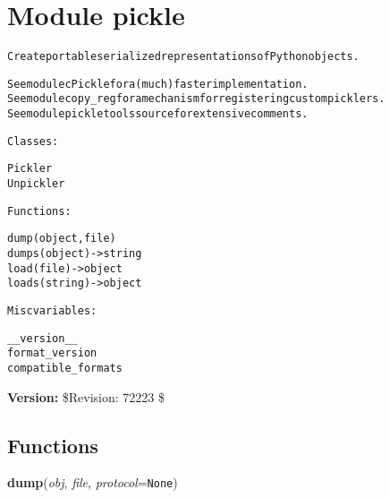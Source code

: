 %
%
%


\section{Module pickle}

    \label{pickle}
\begin{alltt}
Create portable serialized representations of Python objects.

See module cPickle for a (much) faster implementation.
See module copy\_reg for a mechanism for registering custom picklers.
See module pickletools source for extensive comments.

Classes:

    Pickler
    Unpickler

Functions:

    dump(object, file)
    dumps(object) -{\textgreater} string
    load(file) -{\textgreater} object
    loads(string) -{\textgreater} object

Misc variables:

    \_\_version\_\_
    format\_version
    compatible\_formats
\end{alltt}

\textbf{Version:} \$Revision: 72223 \$





  \subsection{Functions}

    \label{pickle:dump}

    \vspace{0.5ex}

\hspace{.8\funcindent}\begin{boxedminipage}{\funcwidth}

    \raggedright \textbf{dump}(\textit{obj}, \textit{file}, \textit{protocol}={\tt None})

\setlength{\parskip}{2ex}
\setlength{\parskip}{1ex}
    \end{boxedminipage}

